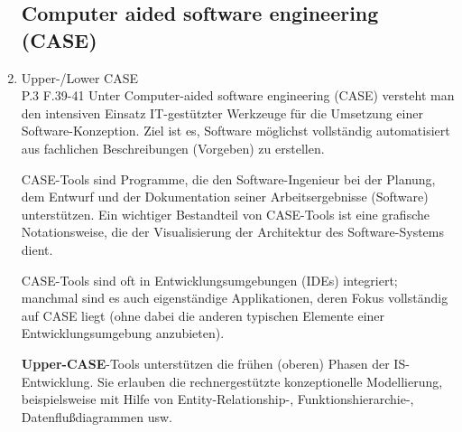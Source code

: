 \documentclass[10pt,a4paper,fleqn]{article}
\begin{document}
\begin{enumerate}
\subsection{Computer aided software engineering (CASE)}
	\item Upper-/Lower CASE\\
	P.3 F.39-41
		Unter Computer-aided software engineering (CASE) versteht man den intensiven Einsatz IT-gestützter Werkzeuge für die Umsetzung einer Software-Konzeption. Ziel ist es, Software möglichst vollständig automatisiert aus fachlichen Beschreibungen (Vorgeben) zu erstellen.
		
		CASE-Tools sind Programme, die den Software-Ingenieur bei der Planung, dem Entwurf und der Dokumentation seiner Arbeitsergebnisse (Software) unterstützen. Ein wichtiger Bestandteil von CASE-Tools ist eine grafische Notationsweise, die der Visualisierung der Architektur des Software-Systems dient.

		CASE-Tools sind oft in Entwicklungsumgebungen (IDEs) integriert; manchmal sind es auch eigenständige Applikationen, deren Fokus vollständig auf CASE liegt (ohne dabei die anderen typischen Elemente einer Entwicklungsumgebung anzubieten).
		
		\textbf{Upper-CASE}-Tools unterstützen die frühen (oberen) Phasen der IS-Entwicklung. Sie erlauben die rechnergestützte konzeptionelle Modellierung, beispielsweise mit Hilfe von Entity-Relationship-, \mbox{Funktionshierarchie-,} Datenflußdiagrammen usw.


\end{enumerate}
\end{document}

